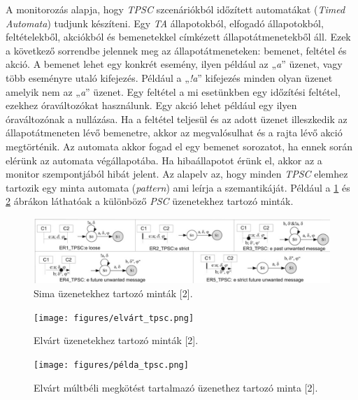 A monitorozás alapja, hogy \textit{TPSC} szcenáriókból időzített automatákat (\textit{Timed Automata}) tudjunk készíteni.
Egy \textit{TA} állapotokból, elfogadó állapotokból, feltételekből, akciókból és bemenetekkel címkézett állapotátmenetekből áll.
Ezek a következő sorrendbe jelennek meg az állapotátmeneteken: bemenet, feltétel és akció.
A bemenet lehet egy konkrét esemény, ilyen például az „\textit{a}” üzenet, vagy több eseményre utaló kifejezés.
Például a „\textit{!a}” kifejezés minden olyan üzenet amelyik nem az „\textit{a}” üzenet.
Egy feltétel a mi esetünkben egy időzítési feltétel, ezekhez óraváltozókat használunk.
Egy akció lehet például egy ilyen óraváltozónak a nullázása.
Ha a feltétel teljesül és az adott üzenet illeszkedik az állapotátmeneten lévő bemenetre, akkor az megvalósulhat és a rajta lévő akció megtörténik.
Az automata akkor fogad el egy bemenet sorozatot, ha ennek során elérünk az automata végállapotába.
Ha hibaállapotot érünk el, akkor az a monitor szempontjából hibát jelent.
Az alapelv az, hogy minden \textit{TPSC} elemhez tartozik egy minta automata (\textit{pattern}) ami leírja a szemantikáját.
Például a \ref{tpsc_sima} és \ref{tpsc_elvárt} ábrákon láthatóak a különböző \textit{PSC} üzenetekhez tartozó minták.

\begin{figure}[!ht]
    \centering
    \includegraphics[width=150mm, keepaspectratio]{figures/sima_tpsc.png}
    \caption{Sima üzenetekhez tartozó minták [2].}
    \label{tpsc_sima}
\end{figure}

\begin{figure}[!ht]
    \centering
    \texttt{[image: figures/elvárt\_tpsc.png]}
    \caption{Elvárt üzenetekhez tartozó minták [2].}
    \label{tpsc_elvárt}
\end{figure}

\begin{figure}[!ht]
    \centering
    \texttt{[image: figures/példa\_tpsc.png]}
    \caption{Elvárt múltbéli megkötést tartalmazó üzenethez tartozó minta [2].}
    \label{tpsc_példa}
\end{figure}

